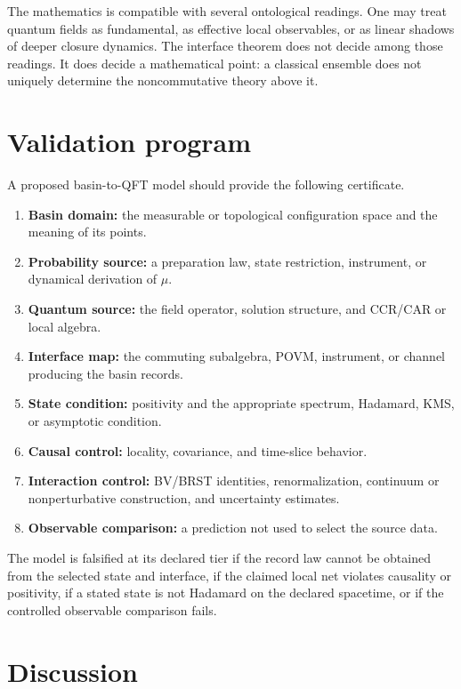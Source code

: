 \documentclass[11pt]{article}
\begin{document}
The mathematics is compatible with several ontological readings.  One may
treat quantum fields as fundamental, as effective local observables, or as
linear shadows of deeper closure dynamics.  The interface theorem does not
decide among those readings.  It does decide a mathematical point: a
classical ensemble does not uniquely determine the noncommutative theory
above it.

\section{Validation program}

A proposed basin-to-QFT model should provide the following certificate.
\begin{enumerate}
\item \textbf{Basin domain:} the measurable or topological configuration
space and the meaning of its points.
\item \textbf{Probability source:} a preparation law, state restriction,
instrument, or dynamical derivation of \(\mu\).
\item \textbf{Quantum source:} the field operator, solution structure, and
CCR/CAR or local algebra.
\item \textbf{Interface map:} the commuting subalgebra, POVM, instrument, or
channel producing the basin records.
\item \textbf{State condition:} positivity and the appropriate spectrum,
Hadamard, KMS, or asymptotic condition.
\item \textbf{Causal control:} locality, covariance, and time-slice
behavior.
\item \textbf{Interaction control:} BV/BRST identities, renormalization,
continuum or nonperturbative construction, and uncertainty estimates.
\item \textbf{Observable comparison:} a prediction not used to select the
source data.
\end{enumerate}

The model is falsified at its declared tier if the record law cannot be
obtained from the selected state and interface, if the claimed local net
violates causality or positivity, if a stated state is not Hadamard on the
declared spacetime, or if the controlled observable comparison fails.

\section{Discussion}
\end{document}
